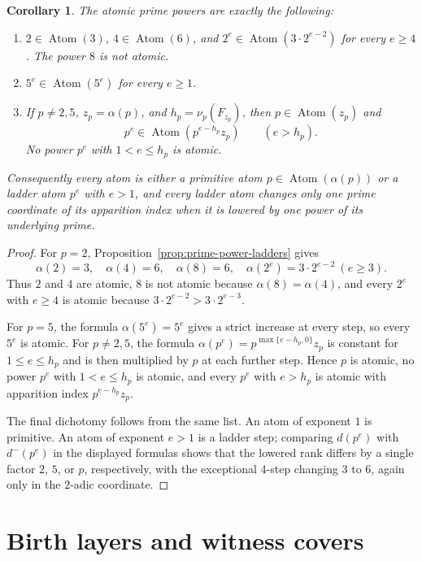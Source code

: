 \documentclass[11pt,letterpaper]{article}
\numberwithin{equation}{section}
\theoremstyle{plain}
\newtheorem{corollary}[theorem]{Corollary}
\theoremstyle{definition}
\theoremstyle{remark}
\DeclareMathOperator{\Atom}{Atom}
\begin{document}
\begin{corollary}\label{cor:atomic-classification}
The atomic prime powers are exactly the following:
\begin{enumerate}[label=\textup{(\roman*)}]
\item \(2\in\Atom(3)\), \(4\in\Atom(6)\), and
\(2^e\in\Atom(3\cdot2^{e-2})\) for every \(e\ge4\). The power \(8\) is not
atomic.
\item \(5^e\in\Atom(5^e)\) for every \(e\ge1\).
\item If \(p\ne2,5\), \(z_p=\alpha(p)\), and
\(h_p=\nu_p(F_{z_p})\), then \(p\in\Atom(z_p)\) and
\[
p^e\in\Atom(p^{e-h_p}z_p)\qquad(e>h_p).
\]
No power \(p^e\) with \(1<e\le h_p\) is atomic.
\end{enumerate}
Consequently every atom is either a primitive atom \(p\in\Atom(\alpha(p))\)
or a ladder atom \(p^e\) with \(e>1\), and every ladder atom changes only one
prime coordinate of its apparition index when it is lowered by one power of
its underlying prime.
\end{corollary}

\begin{proof}
For \(p=2\), Proposition~\ref{prop:prime-power-ladders} gives
\[
\alpha(2)=3,\quad \alpha(4)=6,\quad \alpha(8)=6,\quad
\alpha(2^e)=3\cdot2^{e-2}\ (e\ge3).
\]
Thus \(2\) and \(4\) are atomic, \(8\) is not atomic because
\(\alpha(8)=\alpha(4)\), and every \(2^e\) with \(e\ge4\) is atomic because
\(3\cdot2^{e-2}>3\cdot2^{e-3}\).

For \(p=5\), the formula \(\alpha(5^e)=5^e\) gives a strict increase at every
step, so every \(5^e\) is atomic. For \(p\ne2,5\), the formula
\(\alpha(p^e)=p^{\max\{e-h_p,0\}}z_p\) is constant for
\(1\le e\le h_p\) and is then multiplied by \(p\) at each further step.
Hence \(p\) is atomic, no power \(p^e\) with \(1<e\le h_p\) is atomic, and
every \(p^e\) with \(e>h_p\) is atomic with apparition index
\(p^{e-h_p}z_p\).

The final dichotomy follows from the same list. An atom of exponent \(1\) is
primitive. An atom of exponent \(e>1\) is a ladder step; comparing
\(d(p^e)\) with \(d^-(p^e)\) in the displayed formulas shows that the lowered
rank differs by a single factor \(2\), \(5\), or \(p\), respectively, with the
exceptional \(4\)-step changing \(3\) to \(6\), again only in the \(2\)-adic
coordinate.
\end{proof}

\section{Birth layers and witness covers}\label{sec:upper-fibers}
\end{document}
